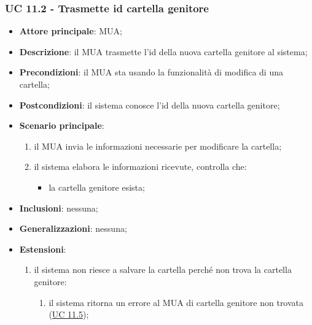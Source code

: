 \subsubsection{UC 11.2 - Trasmette id cartella genitore} \label{sec:UC11.2}
\begin{itemize}
    \item \textbf{Attore principale}: MUA;
    \item \textbf{Descrizione}: il MUA trasmette l'id della nuova cartella genitore al sistema;
    \item \textbf{Precondizioni}: il MUA sta usando la funzionalità di modifica di una cartella;
    \item \textbf{Postcondizioni}: il sistema conosce l'id della nuova cartella genitore;
    \item \textbf{Scenario principale}:
        \begin{enumerate}
            \item il MUA invia le informazioni necessarie per modificare la cartella;
            \item il sistema elabora le informazioni ricevute, controlla che:
            \begin{itemize}
                \item la cartella genitore esista;
            \end{itemize}
        \end{enumerate}
    \item \textbf{Inclusioni}: nessuna;
    \item \textbf{Generalizzazioni}: nessuna;
    \item \textbf{Estensioni}:
        \begin{enumerate}[label=\alph*.]
            \item il sistema non riesce a salvare la cartella perché non trova la cartella genitore:
            \begin{enumerate}[label=\arabic*.]
                \item il sistema ritorna un errore al MUA di cartella genitore non trovata (\hyperref[sec:UC11.5]{UC 11.5});
            \end{enumerate}
        \end{enumerate}
\end{itemize}



